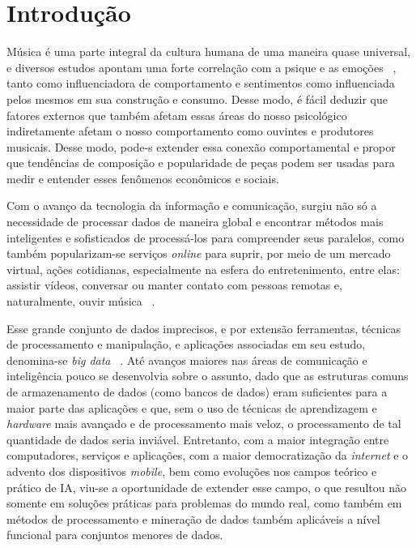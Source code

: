 \chapter{Introdução}
\label{c.introducao}

Música é uma parte integral da cultura humana de uma maneira quase universal, e diversos estudos apontam uma forte correlação com a psique e as emoções ~\cite{krumhansl02}, tanto como influenciadora de comportamento e sentimentos como influenciada pelos mesmos em sua construção e consumo. Desse modo, é fácil deduzir que fatores externos que também afetam essas áreas do nosso psicológico indiretamente afetam o nosso comportamento como ouvintes e produtores musicais. Desse modo, pode-s extender essa conexão comportamental e propor que tendências de composição e popularidade de peças podem ser usadas para medir e entender esses fenômenos econômicos e sociais.

Com o avanço da tecnologia da informação e comunicação, surgiu não só a necessidade de processar dados de maneira global e encontrar métodos mais inteligentes e sofisticados de processá-los para compreender seus paralelos, como também popularizam-se serviços \textit{online} para suprir, por meio de um mercado virtual, ações cotidianas, especialmente na esfera do entretenimento, entre elas: assistir vídeos, conversar ou manter contato com pessoas remotas e, naturalmente, ouvir música ~\cite{aljanaki15}.

Esse grande conjunto de dados imprecisos, e por extensão ferramentas, técnicas de processamento e manipulação, e aplicações associadas em seu estudo, denomina-se \textit{big data} ~\cite{singh15}. Até avanços maiores nas áreas de comunicação e inteligência pouco se desenvolvia sobre o assunto, dado que as estruturas comuns de armazenamento de dados (como bancos de dados) eram suficientes para a maior parte das aplicações e que, sem o uso de técnicas de aprendizagem e \textit{hardware} mais avançado e de processamento mais veloz, o processamento de tal quantidade de dados seria inviável. Entretanto, com a maior integração entre computadores, serviços e aplicações, com a  maior democratização da \textit{internet} e o advento dos dispositivos \textit{mobile}, bem como evoluções nos campos teórico e prático de IA, viu-se a oportunidade de extender esse campo, o que resultou não somente em soluções práticas para problemas do mundo real, como também em métodos de processamento e mineração de dados também aplicáveis a nível funcional para conjuntos menores de dados.

